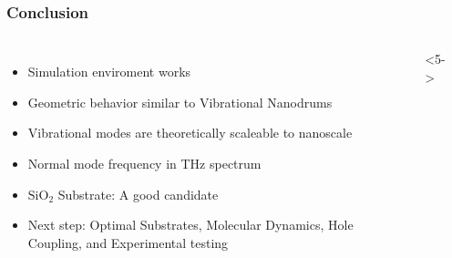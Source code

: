 \documentclass[hyperref={colorlinks=true,urlcolor=blue,linkcolor=.},aspectratio=1610,mathserif]{beamer}
\begin{document}
\begin{frame}
 \frametitle{Conclusion}
 \begin{columns}[T]
  \begin{itemize}
   \item<2-> Simulation enviroment works
   \item<3-> Geometric behavior similar to Vibrational Nanodrums
   \item<4-> Vibrational modes are theoretically scaleable to nanoscale
   \item<5-> Normal mode frequency in THz spectrum
   \item<6-> $\text{SiO}_{2}$ Substrate: A good candidate
   \item<7-> Next step: Optimal Substrates, Molecular Dynamics, Hole Coupling, and Experimental testing
  \end{itemize}
  <5->
  \begin{center}

\end{center}
\end{columns}
\end{frame}
\end{document}
